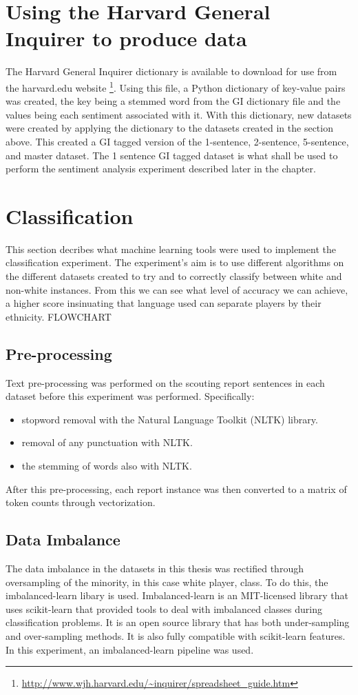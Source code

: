 \documentclass[oneside,12pt]{Classes/RoboticsLaTeX}
\begin{document}
\section{Using the Harvard General Inquirer to produce data}
\label{sec:GI_dict}
The Harvard General Inquirer dictionary is available to download for use from the harvard.edu website \footnote{\url{http://www.wjh.harvard.edu/~inquirer/spreadsheet_guide.htm}}. Using this file, a Python
dictionary of key-value pairs was created, the key being a stemmed word from the GI dictionary file and the values being each sentiment associated with it. With this dictionary, new datasets were created by 
applying the dictionary to the datasets created in the section above. This created a GI tagged version of the 1-sentence, 2-sentence, 5-sentence, and master dataset. The 1 sentence GI tagged 
dataset is what shall be used to perform the sentiment analysis experiment described later in the chapter.


\section{Classification}
\label{sec:sci-kit_label}
This section decribes what machine learning tools were used to implement the classification experiment. The experiment's aim is to use different algorithms on the different datasets created to try and to
correctly classify between white and non-white instances. From this we can see what level of accuracy we can achieve, a higher score insinuating that language used can separate players by their ethnicity.
FLOWCHART
\subsection{Pre-processing}
Text pre-processing was performed on the scouting report sentences in each dataset before this experiment was performed.
Specifically:
\begin{itemize}
  \item stopword removal with the Natural Language Toolkit (NLTK) library.
  \item removal of any punctuation with NLTK.
  \item the stemming of words also with NLTK.
\end{itemize}
After this pre-processing, each report instance was then converted to a matrix of token counts through vectorization.

\subsection{Data Imbalance}
The data imbalance in the datasets in this thesis was rectified through oversampling of the minority, in this case white player, class. To do this, the imbalanced-learn libary \citep{imb-learn} is used.
Imbalanced-learn is an MIT-licensed library that uses scikit-learn that provided tools to deal with imbalanced classes during classification problems. It is an open source library that has
both under-sampling and over-sampling methods. It is also fully compatible with scikit-learn features. In this experiment, an imbalanced-learn pipeline was used.
\end{document}

